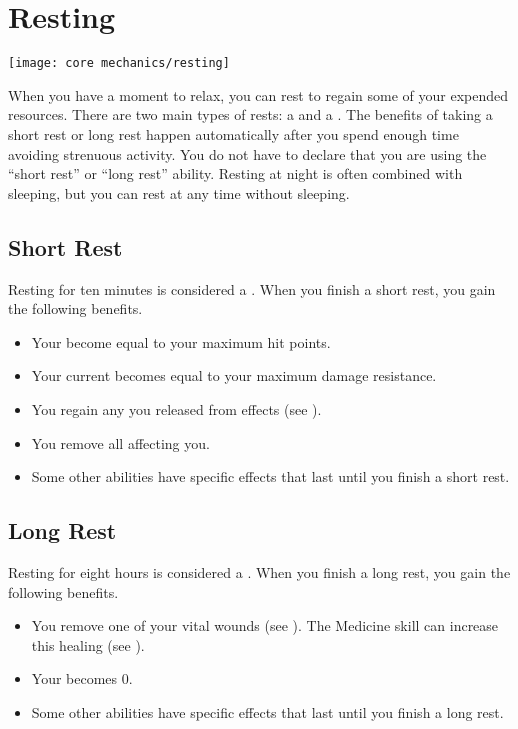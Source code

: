 \section{Resting}\label{Resting}
  \texttt{[image: core mechanics/resting]}

  When you have a moment to relax, you can rest to regain some of your expended resources.
  There are two main types of rests: a  and a .
  The benefits of taking a short rest or long rest happen automatically after you spend enough time avoiding strenuous activity.
  You do not have to declare that you are using the ``short rest'' or ``long rest'' ability.
  Resting at night is often combined with sleeping, but you can rest at any time without sleeping.


  \subsection{Short Rest}\label{Short Rest}
    Resting for ten minutes is considered a .
    When you finish a short rest, you gain the following benefits.
    \begin{itemize}
      \item Your  become equal to your maximum hit points.
      \item Your current  becomes equal to your maximum damage resistance.
      \item You regain any  you released from  effects (see ).
      \item You remove all  affecting you.
      \item Some other abilities have specific effects that last until you finish a short rest.
    \end{itemize}

  \subsection{Long Rest}\label{Long Rest}
    Resting for eight hours is considered a .
    When you finish a long rest, you gain the following benefits.
    \begin{itemize}
      \item You remove one of your vital wounds (see ).
        The Medicine skill can increase this healing (see ).
      \item Your  becomes 0.
      \item Some other abilities have specific effects that last until you finish a long rest.
    \end{itemize}

